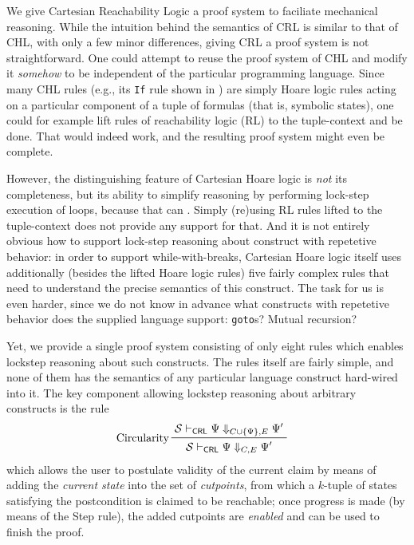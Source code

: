 We give Cartesian Reachability Logic a proof system to faciliate mechanical reasoning.
While the intuition behind the semantics of CRL is similar to that of CHL, with only a few minor differences,
giving CRL a proof system is not straightforward.
One could attempt to reuse the proof system of CHL and modify it \emph{somehow} to be independent
of the particular programming language.
Since many CHL rules (e.g., its \texttt{If} rule shown in ) are simply Hoare logic rules acting on a particular component of
a tuple of formulas (that is, symbolic states),
one could for example lift rules of reachability logic (RL) to the tuple-context and be done.
That would indeed work, and the resulting proof system might even be complete.

However, the distinguishing feature of Cartesian Hoare logic is \emph{not} its completeness,
but its ability to simplify reasoning by performing lock-step execution of loops,
because that can .
Simply (re)using RL rules lifted to the tuple-context does not provide any support for that.
And it is not entirely obvious how to support lock-step reasoning about construct with repetetive behavior:
in order to support while-with-breaks, Cartesian Hoare logic itself uses additionally (besides the lifted Hoare logic rules)
five fairly complex rules that need to understand the precise semantics of this construct.
The task for us is even harder, since we do not know in advance what constructs with repetetive behavior does
the supplied language support: \texttt{goto}s? Mutual recursion? 

Yet, we provide a single proof system consisting of only eight rules which enables lockstep reasoning about such constructs.
The rules itself are fairly simple, and none of them has the semantics of any particular language construct
hard-wired into it.
The key component allowing lockstep reasoning about arbitrary constructs is the rule
\begin{align*}
  & \prftree[l]{Circularity}
    { \mathcal{S} \vdash_\CRL \Psi \Downarrow_{C \cup \{ \Psi \} , E} \Psi^\prime}
    { \mathcal{S} \vdash_\CRL \Psi \Downarrow_{C, E} \Psi^\prime}
\end{align*}
which allows the user to postulate validity of the current claim by means of adding the \emph{current state}
into the set of \emph{cutpoints}, from which a $k$-tuple of states satisfying the postcondition
is claimed to be reachable; once progress is made (by means of the Step rule), the added cutpoints are
\emph{enabled} and can be used to finish the proof.

